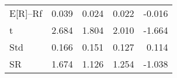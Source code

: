 \begin{tabular}{lrrrr}
\toprule
\midrule
E[R]--Rf & 0.039 & 0.024 & 0.022 & -0.016 \\
t & 2.684 & 1.804 & 2.010 & -1.664 \\
Std & 0.166 & 0.151 & 0.127 & 0.114 \\
SR & 1.674 & 1.126 & 1.254 & -1.038 \\
\bottomrule
\end{tabular}
